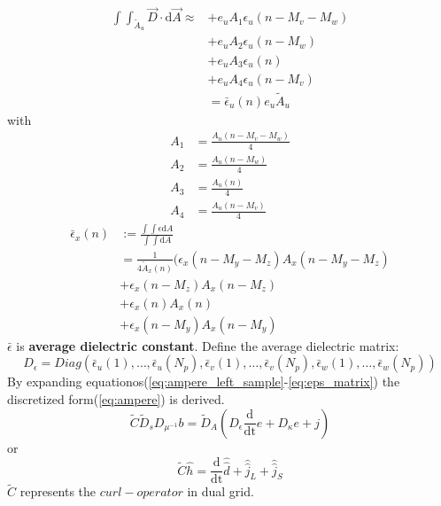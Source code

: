 \begin{align}
\int\int_{\tilde{A}_{u}}\vec{D}\cdot\mathrm{d}\vec{A}\approx &+e_{u}A_{1}\epsilon_{u}(n-M_{v}-M_{w}) \nonumber\\
&+e_{u}A_{2}\epsilon_{u}(n-M_{w}) \nonumber\\
&+e_{u}A_{3}\epsilon_{u}(n) \nonumber\\
&+e_{u}A_{4}\epsilon_{u}(n-M_{v}) \nonumber\\
&=\bar{\epsilon}_{u}(n)e_{u}\tilde{A}_{u}
\label{eq:ampere_right}
\end{align}
with 
\begin{align}
A_{1}&=\frac{A_{u}(n-M_{v}-M_{w})}{4}\\
A_{2}&=\frac{A_{u}(n-M_{w})}{4}\\
A_{3}&=\frac{A_{u}(n)}{4}\\
A_{4}&=\frac{A_{u}(n-M_{v})}{4}
\end{align}
\begin{align}
\bar{\epsilon}_{x}(n)&:=\frac{\int\int\epsilon\mathrm{d}A}{\int\int\mathrm{d}A}\nonumber\\
&=\frac{1}{4\tilde{A}_{x}(n)}(\epsilon_{x}(n-M_{y}-M_{z})A_{x}(n-M_{y}-M_{z})\nonumber\\
&+\epsilon_{x}(n-M_{z})A_{x}(n-M_{z}) \nonumber\\
&+\epsilon_{x}(n)A_{x}(n) \nonumber\\
&+\epsilon_{x}(n-M_{y})A_{x}(n-M_{y})
\end{align}
$\bar{\epsilon}$ is \textbf{average dielectric constant}. 
Define the average dielectric matrix:
\begin{equation}
D_{\epsilon}=Diag(\bar{\epsilon}_{u}(1),\ldots,\bar{\epsilon}_{u}(N_{p}),\bar{\epsilon}_{v}(1),\ldots,\bar{\epsilon}_{v}(N_{p}),\bar{\epsilon}_{w}(1),\ldots,\bar{\epsilon}_{w}(N_{p}))
\label{eq:eps_matrix}
\end{equation}
By expanding equationos(\ref{eq:ampere_left_sample}-\ref{eq:eps_matrix}) the discretized form(\ref{eq:ampere}) is derived.
\begin{equation}
\tilde{C}\tilde{D}_{s}D_{\mu^{-1}}b=\tilde{D}_{A}(D_{\epsilon}\frac{\mathrm{d}}{\mathrm{dt}}e+D_{\kappa}e+j)
\label{eq:ampere}
\end{equation}
or
\begin{equation}
\tilde{C}\widehat{h}=\frac{\mathrm{d}}{\mathrm{dt}}\widehat{\widehat{d}}+\widehat{\widehat{j}}_{L}+\widehat{\widehat{j}}_{S}
\label{eq:ampere_sample}
\end{equation}
$\tilde{C}$ represents the $curl-operator$ in dual grid.
